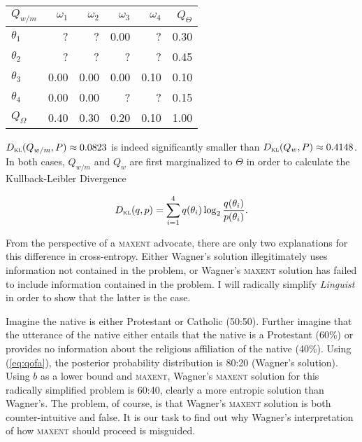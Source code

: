 \documentclass[11pt]{article}
\begin{document}
\medskip

\begin{tabular}{|l|r|r|r|r|r|}\hline
  $Q_{w/m}$ & $\omega_{1}$ & $\omega_{2}$ & $\omega_{3}$ & $\omega_{4}$ & $Q_{\Theta}$ \\ \hline
$\theta_{1}$ & ? & ? & 0.00 & ? & 0.30 \\ \hline
$\theta_{2}$ & ? & ? & ? & ? & 0.45 \\ \hline
$\theta_{3}$ & 0.00 & 0.00 & 0.00 & 0.10 & 0.10 \\ \hline
$\theta_{4}$ & 0.00 & 0.00 & ? & ? & 0.15 \\ \hline
$Q_{\Omega}$ & 0.40 & 0.30 & 0.20 & 0.10 & 1.00\\ \hline
\end{tabular}

\medskip

$D_{\textsc{kl}}(Q_{w/m},P)\approx{}0.0823$ is indeed significantly
smaller than $D_{\textsc{kl}}(Q_{w},P)\approx{}0.4148$. In both cases,
$Q_{w/m}$ and $Q_{w}$ are first marginalized to $\Theta$ in order to
calculate the Kullback-Leibler Divergence

\begin{equation}
  \label{eq:kl}
  D_{\textsc{kl}}(q,p)=\sum_{i=1}^{4}q(\theta_{i})\log_{2}\frac{q(\theta_{i})}{p(\theta_{i})}.
\end{equation}

From the perspective of a \textsc{maxent} advocate, there are only
two explanations for this difference in cross-entropy. Either
Wagner's solution illegitimately uses information not contained in
the problem, or Wagner's \textsc{maxent} solution has failed to
include information contained in the problem. I will radically
simplify \emph{Linguist} in order to show that the latter is
the case. 

Imagine the native is either Protestant or Catholic (50:50).
Further imagine that the utterance of the native either entails
that the native is a Protestant (60\%) or provides no information
about the religious affiliation of the native (40\%). Using
(\ref{eq:qofa}), the posterior probability distribution is 80:20
(Wagner's solution). Using $b$ as a lower bound and
\textsc{maxent}, Wagner's \textsc{maxent} solution for this
radically simplified problem is 60:40, clearly a more entropic
solution than Wagner's. The problem, of course, is that 
Wagner's \textsc{maxent} solution is both counter-intuitive and
false. It is our task to find out why Wagner's interpretation of
how \textsc{maxent} should proceed is misguided.
\end{document}
